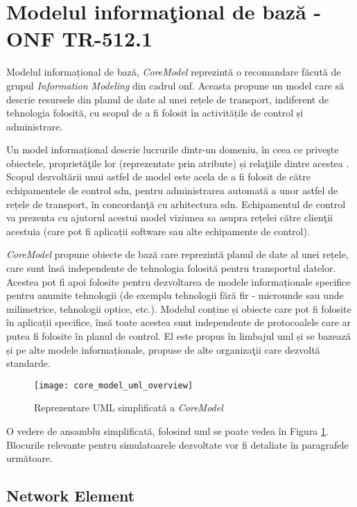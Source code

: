 \section{Modelul informaţional de bază - ONF TR-512.1}

Modelul informațional de bază, \textit{CoreModel} reprezintă o recomandare făcută de grupul \textit{Information Modeling} din cadrul \gls{onf}. Aceasta propune un model care să descrie resursele din planul de date al unei rețele de transport, indiferent de tehnologia folosită, cu scopul de a fi folosit în activitățile de control și administrare.

Un model informațional descrie lucrurile dintr-un domeniu, în ceea ce priveşte obiectele, proprietăţile lor (reprezentate prin atribute) și relaţiile dintre acestea \cite{onftr512v1.0}. Scopul dezvoltării unui astfel de model este acela de a fi folosit de către echipamentele de control \gls{sdn}, pentru administrarea automată a unor astfel de rețele de transport, în concordanţă cu arhitectura \gls{sdn}. Echipamentul de control va prezenta cu ajutorul acestui model viziunea sa asupra rețelei către clienţii acestuia (care pot fi aplicații software sau alte echipamente de control).

\textit{CoreModel} propune obiecte de bază care reprezintă planul de date al unei rețele, care sunt însă independente de tehnologia folosită pentru transportul datelor. Acestea pot fi apoi folosite pentru dezvoltarea de modele informaționale specifice pentru anumite tehnologii (de exemplu tehnologii fără fir - microunde sau unde milimetrice, tehnologii optice, etc.). Modelul conține și obiecte care pot fi folosite în aplicații specifice, însă toate acestea sunt independente de protocoalele care ar putea fi folosite în planul de control. El este propus în limbajul \gls{uml} și se bazează și pe alte modele informaționale, propuse de alte organizaţii care dezvoltă standarde.

\begin{figure}[t]
	\centering
	\texttt{[image: core\_model\_uml\_overview]}
	\caption{Reprezentare UML simplificată a \textit{CoreModel}}
	\label{fig:core_model}
\end{figure}

O vedere de ansamblu simplificată, folosind \gls{uml} se poate vedea în Figura \ref{fig:core_model}. Blocurile relevante pentru simulatoarele dezvoltate vor fi detaliate în paragrafele următoare.

\subsection{Network Element}

